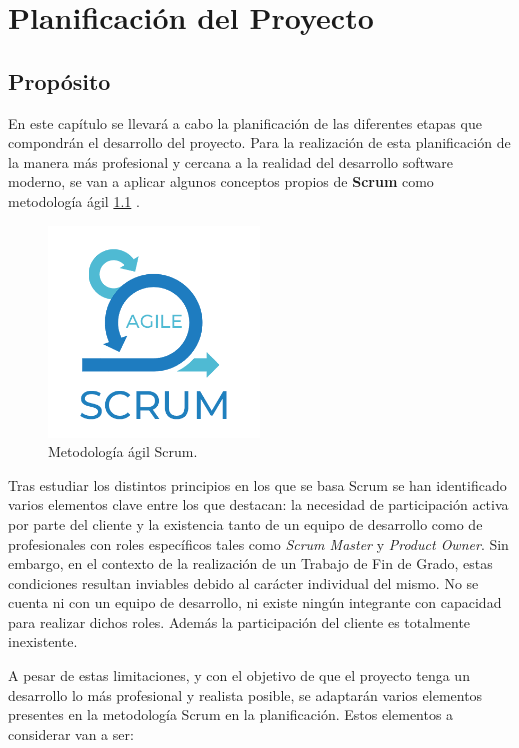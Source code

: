 \chapter{Planificación del Proyecto} \label{requisitos}

\section{Propósito}

En este capítulo se llevará a cabo la planificación de las diferentes etapas que compondrán el desarrollo del proyecto. Para la realización de esta planificación de la manera más profesional y cercana a la realidad del desarrollo software moderno, se van a aplicar algunos conceptos propios de \textbf{Scrum} \cite{scrum} como metodología ágil \ref{fig:scrum-logo} .
\begin{figure}[H]
    \centering
    \includegraphics[width=0.5\textwidth]{fotos/scrum.png}
    \caption{Metodología ágil Scrum\textbf{}.}
    \label{fig:scrum-logo}
\end{figure}
Tras estudiar los distintos principios en los que se basa Scrum se han identificado varios elementos clave entre los que destacan: la necesidad de participación activa por parte del cliente y la existencia tanto de un equipo de desarrollo como de profesionales con roles específicos tales como \textit{Scrum Master} y \textit{Product Owner}. Sin embargo, en el contexto de la realización de un Trabajo de Fin de Grado, estas condiciones resultan inviables debido al carácter individual del mismo. No se cuenta ni con un equipo de desarrollo, ni existe ningún integrante con capacidad para realizar dichos roles. Además la participación del cliente es totalmente inexistente.

A pesar de estas limitaciones, y con el objetivo de que el proyecto tenga un desarrollo lo más profesional y realista posible, se adaptarán varios elementos presentes en la metodología Scrum en la planificación. Estos elementos a considerar van a ser:

